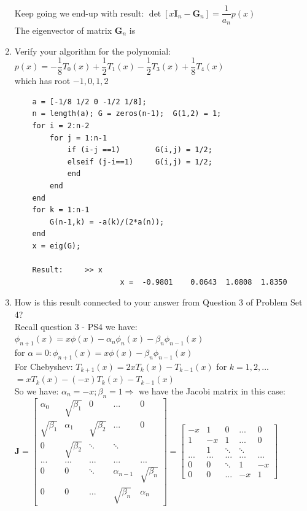 \documentclass[14pt,a4paper]{article}
\begin{document}
\begin{enumerate}
\begin{align*}
	 \end{align*} 
	 Keep going we end-up with result: $\det[x\textbf{I}_n - \textbf{G}_n] = \dfrac{1}{a_n}p(x)$\\
	 The eigenvector of matrix $\textbf{G}_n$ is \\
	\label{5e}
	\item Verify your algorithm for the polynomial:
	$ p(x) = -\dfrac{1}{8}T_0(x) + \dfrac{1}{2}T_1(x) - \dfrac{1}{2}T_3(x) + \dfrac{1}{8}T_4(x) $\\
	which has root $-1, 0, 1, 2$
	\begin{lstlisting}
	a = [-1/8 1/2 0 -1/2 1/8];
	n = length(a); G = zeros(n-1); 	G(1,2) = 1;
	for i = 2:n-2
		for j = 1:n-1
			if (i-j ==1) 		G(i,j) = 1/2;
			elseif (j-i==1)		G(i,j) = 1/2;
			end
		end
	end
	for k = 1:n-1
		G(n-1,k) = -a(k)/(2*a(n));
	end
	x = eig(G);
	
	Result: 	>> x
						x =  -0.9801	0.0643	1.0808	1.8350
	\end{lstlisting}
		
	
	\label{5f}
	\item How is this result connected to your answer from Question 3 of Problem Set 4? \\
	Recall question 3 - PS4 we have: $\phi_{n+1}(x) = x\phi(x) - \alpha_n\phi_n(x) - \beta_n\phi_{n-1}(x)$\\
	for $\alpha = 0: \phi_{n+1}(x) = x\phi(x) - \beta_n\phi_{n-1}(x)$\\
	For Chebyshev: $T_{k+1}(x) = 2xT_k(x) - T_{k-1}(x) $ for $k = 1,2,...$\\
	\hspace*{4.3cm} $ = xT_k(x) - (-x)T_k(x)- T_{k-1}(x) $\\
	So we  have: $\alpha_n = -x; \beta_n = 1 \Rightarrow $ we have the Jacobi matrix in this case:\\
	\hspace*{1cm} $ \textbf{J} = \begin{bmatrix} \alpha_0 & \sqrt{\beta_1} & 0 & ... & 0 \\ \sqrt{\beta_1} & \alpha_1 & \sqrt{\beta_2} & ... & 0 \\ 0 & \sqrt{\beta_2} & \ddots & \ddots \\ ...&...&...&...&...\\ 0 & 0 & \ddots & \alpha_{n-1} & \sqrt{\beta_n} \\ 0 & 0 & ... & \sqrt{\beta_n} & \alpha_n \end{bmatrix} = \begin{bmatrix} -x & 1 & 0 & ... & 0 \\ 1 & -x & 1 & ... & 0 \\  & 1 & \ddots & \ddots \\...&...&...&...&...\\ 0 & 0 & \ddots & 1 & -x \\ 0 & 0 & ... & -x & 1 \end{bmatrix}$
\end{enumerate} 
\end{document}
